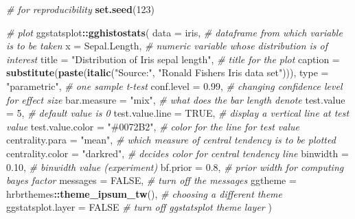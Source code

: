 \documentclass[
]{article}
\newenvironment{Shaded}{\begin{snugshade}}{\end{snugshade}}
\newcommand{\CommentTok}[1]{\textcolor[rgb]{0.56,0.35,0.01}{\textit{#1}}}
\newcommand{\DataTypeTok}[1]{\textcolor[rgb]{0.13,0.29,0.53}{#1}}
\newcommand{\DecValTok}[1]{\textcolor[rgb]{0.00,0.00,0.81}{#1}}
\newcommand{\FloatTok}[1]{\textcolor[rgb]{0.00,0.00,0.81}{#1}}
\newcommand{\KeywordTok}[1]{\textcolor[rgb]{0.13,0.29,0.53}{\textbf{#1}}}
\newcommand{\NormalTok}[1]{#1}
\newcommand{\OperatorTok}[1]{\textcolor[rgb]{0.81,0.36,0.00}{\textbf{#1}}}
\newcommand{\OtherTok}[1]{\textcolor[rgb]{0.56,0.35,0.01}{#1}}
\newcommand{\StringTok}[1]{\textcolor[rgb]{0.31,0.60,0.02}{#1}}
\begin{document}
\begin{Shaded}
\begin{Highlighting}[]
\CommentTok{\# for reproducibility}
\KeywordTok{set.seed}\NormalTok{(}\DecValTok{123}\NormalTok{)}

\CommentTok{\# plot}
\NormalTok{ggstatsplot}\OperatorTok{::}\KeywordTok{gghistostats}\NormalTok{(}
  \DataTypeTok{data =}\NormalTok{ iris, }\CommentTok{\# dataframe from which variable is to be taken}
  \DataTypeTok{x =}\NormalTok{ Sepal.Length, }\CommentTok{\# numeric variable whose distribution is of interest}
  \DataTypeTok{title =} \StringTok{"Distribution of Iris sepal length"}\NormalTok{, }\CommentTok{\# title for the plot}
  \DataTypeTok{caption =} \KeywordTok{substitute}\NormalTok{(}\KeywordTok{paste}\NormalTok{(}\KeywordTok{italic}\NormalTok{(}\StringTok{"Source:"}\NormalTok{, }\StringTok{"Ronald Fisher\textquotesingle{}s Iris data set"}\NormalTok{))),}
  \DataTypeTok{type =} \StringTok{"parametric"}\NormalTok{, }\CommentTok{\# one sample t{-}test}
  \DataTypeTok{conf.level =} \FloatTok{0.99}\NormalTok{, }\CommentTok{\# changing confidence level for effect size}
  \DataTypeTok{bar.measure =} \StringTok{"mix"}\NormalTok{, }\CommentTok{\# what does the bar length denote}
  \DataTypeTok{test.value =} \DecValTok{5}\NormalTok{, }\CommentTok{\# default value is 0}
  \DataTypeTok{test.value.line =} \OtherTok{TRUE}\NormalTok{, }\CommentTok{\# display a vertical line at test value}
  \DataTypeTok{test.value.color =} \StringTok{"\#0072B2"}\NormalTok{, }\CommentTok{\# color for the line for test value}
  \DataTypeTok{centrality.para =} \StringTok{"mean"}\NormalTok{, }\CommentTok{\# which measure of central tendency is to be plotted}
  \DataTypeTok{centrality.color =} \StringTok{"darkred"}\NormalTok{, }\CommentTok{\# decides color for central tendency line}
  \DataTypeTok{binwidth =} \FloatTok{0.10}\NormalTok{, }\CommentTok{\# binwidth value (experiment)}
  \DataTypeTok{bf.prior =} \FloatTok{0.8}\NormalTok{, }\CommentTok{\# prior width for computing bayes factor}
  \DataTypeTok{messages =} \OtherTok{FALSE}\NormalTok{, }\CommentTok{\# turn off the messages}
  \DataTypeTok{ggtheme =}\NormalTok{ hrbrthemes}\OperatorTok{::}\KeywordTok{theme\_ipsum\_tw}\NormalTok{(), }\CommentTok{\# choosing a different theme}
  \DataTypeTok{ggstatsplot.layer =} \OtherTok{FALSE} \CommentTok{\# turn off ggstatsplot theme layer}
\NormalTok{)}
\end{Highlighting}
\end{Shaded}
\end{document}
